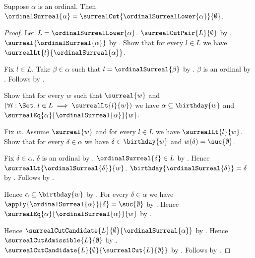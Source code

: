 \begin{theorem}\label{ordinal_surreal_cut_equation}
    Suppose $\alpha$ is an ordinal.
    Then $\ordinalSurreal{\alpha}=
        \surrealCut{\ordinalSurrealLower{\alpha}}{\emptyset}$.
\end{theorem}
\begin{proof}
    Let $L=\ordinalSurrealLower{\alpha}$.
    $\surrealCutPair{L}{\emptyset}$
        by .
    $\surreal{\ordinalSurreal{\alpha}}$
        by .
    Show that for every $l\in L$ we have
        $\surrealLt{l}{\ordinalSurreal{\alpha}}$.
    \begin{subproof}
        Fix $l\in L$.
        Take $\beta\in\alpha$ such that
            $l=\ordinalSurreal{\beta}$
            by .
        $\beta$ is an ordinal by .
        Follows by .
    \end{subproof}
    Show that for every $w$ such that $\surreal{w}$ and
        $(\forall l:\Set.\ l\in L\implies\surrealLt{l}{w})$ we have
        $\alpha\subseteq\birthday{w}$ and
        $\surrealEq{\alpha}{\ordinalSurreal{\alpha}}{w}$.
    \begin{subproof}
        Fix $w$.
        Assume $\surreal{w}$ and
            for every $l\in L$ we have $\surrealLt{l}{w}$.
        Show that for every $\delta\in\alpha$ we have
            $\delta\in\birthday{w}$ and
            $w(\delta)=\suc{\emptyset}$.
        \begin{subproof}
            Fix $\delta\in\alpha$.
            $\delta$ is an ordinal
                by .
            $\ordinalSurreal{\delta}\in L$
                by .
            Hence $\surrealLt{\ordinalSurreal{\delta}}{w}$.
            $\birthday{\ordinalSurreal{\delta}}=\delta$
                by .
            Follows by .
        \end{subproof}
        Hence $\alpha\subseteq\birthday{w}$
            by .
        For every $\delta\in\alpha$ we have
            $\apply{\ordinalSurreal{\alpha}}{\delta}=\suc{\emptyset}$
            by .
        Hence $\surrealEq{\alpha}{\ordinalSurreal{\alpha}}{w}$
            by .
    \end{subproof}
    Hence $\surrealCutCandidate{L}{\emptyset}
        {\ordinalSurreal{\alpha}}$
        by .
    Hence $\surrealCutAdmissible{L}{\emptyset}$
        by .
    $\surrealCutCandidate{L}{\emptyset}
        {\surrealCut{L}{\emptyset}}$
        by .
    Follows by .
\end{proof}

